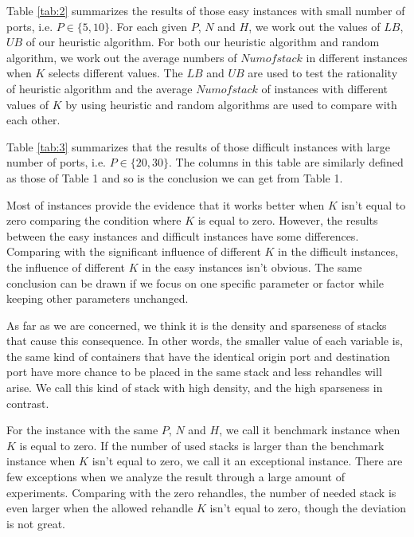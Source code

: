 \documentclass[review,3p,times,authoryear,12pt]{elsarticle}
\begin{document}
Table \ref{tab:2} summarizes the results of those easy instances with small number of ports, i.e. $P \in \{5, 10\}$.
For each given $P$, $N$ and $H$, we work out the values of $LB$, $UB$ of our heuristic algorithm.
For both our heuristic algorithm and random algorithm, we work out the average numbers of $Numofstack$ in different instances when $K$ selects different values.
The $LB$ and $UB$ are used to test the rationality of heuristic algorithm and the average $Numofstack$ of instances with different values of $K$ by using heuristic and random algorithms are used to compare with each other.

Table \ref{tab:3} summarizes that the results of those difficult instances with large number of ports, i.e. $P \in \{20, 30\}$.
The columns in this table are similarly defined as those of Table 1 and so is the conclusion we can get from Table 1.

Most of instances provide the evidence that it works better when $K$ isn't equal to zero comparing the condition where $K$ is equal to zero.
However, the results between the easy instances and difficult instances have some differences.
Comparing with the significant influence of different $K$ in the difficult instances, the influence of different $K$ in the easy instances isn't obvious.
The same conclusion can be drawn if we focus on one specific parameter or factor while keeping other parameters unchanged.

As far as we are concerned, we think it is the density and sparseness of stacks that cause this consequence.
In other words, the smaller value of each variable is, the same kind of containers that have the identical origin port and destination port have more chance to be placed in the same stack and less rehandles will arise.
We call this kind of stack with high density, and the high sparseness in contrast.

For the instance with the same $P$, $N$ and $H$, we call it benchmark instance when $K$ is equal to zero.
If the number of used stacks is larger than the benchmark instance when $K$ isn't equal to zero, we call it an exceptional instance.
There are few exceptions when we analyze the result through a large amount of experiments.
Comparing with the zero rehandles, the number of needed stack is even larger when the allowed rehandle $K$ isn't equal to zero, though the deviation is not great.
\end{document}

